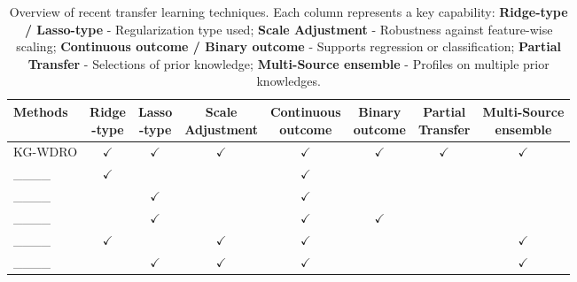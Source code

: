 \begin{table*}[!ht]
\caption{Overview of recent transfer learning techniques. Each column represents a key capability:  
\textbf{Ridge-type / Lasso-type} - Regularization type used;  
\textbf{Scale Adjustment} - Robustness against feature-wise scaling;  
\textbf{Continuous outcome / Binary outcome} - Supports regression or classification;  
\textbf{Partial Transfer} - Selections of prior knowledge;  
\textbf{Multi-Source ensemble} - Profiles on multiple prior knowledges.}
\label{tab:comparison}
\vskip 0.1in
\begin{center}
\begin{small}
\setlength{\tabcolsep}{3pt} %
\renewcommand{\arraystretch}{1.1} %
\begin{tabular}{lccccccc}
\toprule
Methods & \makecell{Ridge \\ -type}  & \makecell{Lasso \\ -type} & \makecell{Scale \\ Adjustment} & \makecell{Continuous \\ outcome} & \makecell{Binary \\ outcome} & \makecell{Partial \\ Transfer} & \makecell{Multi-Source \\ ensemble} \\
\midrule
KG-WDRO   & $\checkmark$ & $\checkmark$ & $\checkmark$ & $\checkmark$ &  $\checkmark$ & $\checkmark$& $\checkmark$\\
____ & $\checkmark$ &  & & $\checkmark$ & & & \\
____ & & $\checkmark$ &  & $\checkmark$ &   &  &  \\
____ &  & $\checkmark$ & & $\checkmark$ &  $\checkmark$ &  &  \\
____ & $\checkmark$ &  & $\checkmark$ & $\checkmark$ &  &  & $\checkmark$ \\
____ &  & $\checkmark$ & $\checkmark$ & $\checkmark$ &   &  & $\checkmark$ \\
\bottomrule
\end{tabular}
\end{small}
\end{center}
\end{table*}